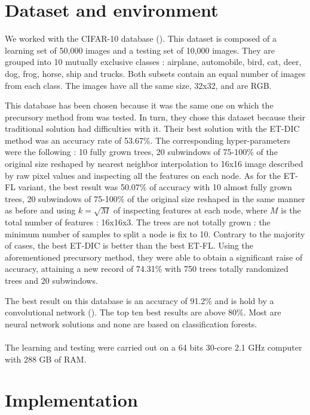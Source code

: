 \documentclass[a4paper]{report}
\begin{document}
	\section{Dataset and environment} %
	We worked with the CIFAR-10 database (\cite{cifar}). This dataset is composed of a learning set of 50,000 images and a testing set of 10,000 images. They are grouped into 10 mutually exclusive classes : airplane, automobile, bird, cat, deer, dog, frog, horse, ship and trucks. Both subsets contain an equal number of images from each class. The images have all the same size, 32x32, and are RGB.
	\par
	This database has been chosen because it was the same one on which the precursory method from \cite{} was tested. In turn, they chose this dataset because their traditional solution had difficulties with it. Their best solution with the ET-DIC method was an accuracy rate of 53.67\%. The corresponding hyper-parameters were the following : 10 fully grown trees, 20 subwindows of 75-100\% of the original size reshaped by nearest neighbor interpolation to 16x16 image described by raw pixel values and inspecting all the features on each node. As for the ET-FL variant, the best result was 50.07\% of accuracy with 10 almost fully grown trees, 20 subwindows of 75-100\% of the original size reshaped in the same manner as before and using $k = \sqrt{M}$ of inspecting features at each node, where $M$ is the total number of features : 16x16x3. The trees are not totally grown : the minimum number of samples to split a node is fix to 10. Contrary to the majority of cases, the best ET-DIC is better than the best ET-FL.
	Using the aforementioned precursory method, they were able to obtain a significant raise of accuracy, attaining a new record of 74.31\% with 750 trees totally randomized trees and 20 subwindows.
	\par
	The best result on this database is an accuracy of 91.2\% and is hold by a convolutional network (\cite{bestcifar}). The top ten best results are above 80\%. Most are neural network solutions and none are based on classification forests.
	\paragraph{}
	The learning and testing were carried out on a 64 bits 30-core 2.1 GHz computer with 288 GB of RAM. %
	
	
	\section{Implementation}
	
\end{document}
